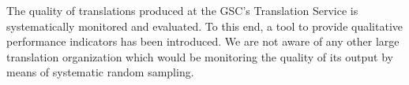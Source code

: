 \documentclass[output=paper]{langsci/langscibook}
\begin{document}
The quality of translations produced at the GSC’s Translation Service is systematically monitored and evaluated. To this end, a tool to provide qualitative performance indicators has been introduced. We are not aware of any other large translation organization which would be monitoring the quality of its output by means of systematic random sampling.

  

\sloppy
\printbibliography[heading=subbibliography,notkeyword=this] 
\end{document}
